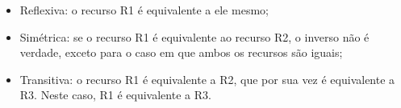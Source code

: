 \begin{itemize}
	\item Reflexiva: o recurso R1 é equivalente a ele mesmo;
	\item Simétrica: se o recurso R1 é equivalente ao recurso R2, o inverso não é verdade, exceto para o caso em que ambos os recursos são iguais;
	\item Transitiva: o recurso R1 é equivalente a R2, que por sua vez é equivalente a R3. Neste caso, R1 é equivalente a R3.
\end{itemize}

